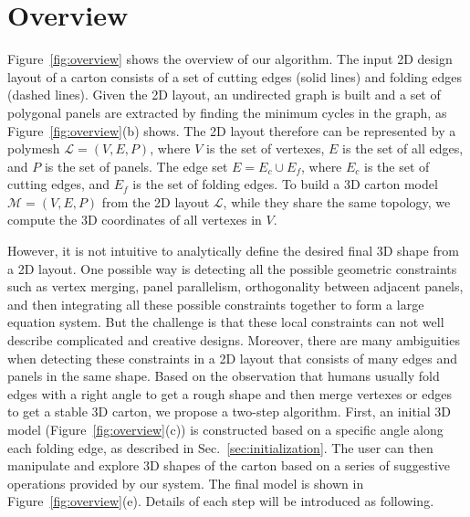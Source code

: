 \section{Overview}\label{sec:overview}


Figure~\ref{fig:overview} shows the overview of our algorithm. 
The input 2D design layout of a carton consists of a set of cutting edges (solid lines) and folding edges (dashed lines).
%
Given the 2D layout, an undirected graph is built and a set of polygonal panels are extracted by finding the minimum cycles in the graph, as Figure~\ref{fig:overview}(b) shows. 
The 2D layout therefore can be represented by a polymesh $\mathcal{L}=(V,E,P)$, where $V$ is the set of vertexes, $E$ is the set of all edges, and $P$ is the set of panels. 
The edge set $E=E_c\cup E_f$, where $E_c$ is the set of cutting edges, and $E_f$ is the set of folding edges.
%
To build a 3D carton model $\mathcal{M}=(V, E, P)$ from the 2D layout $\mathcal{L}$, while they share the same topology, we compute the 3D coordinates of all vertexes in $V$. 
%

However, it is not intuitive to analytically define the desired final 3D shape from a 2D layout. 
One possible way is detecting all the possible geometric constraints such as vertex merging, panel parallelism, orthogonality between adjacent panels, and then integrating all these possible constraints together to form a large equation system. 
But the challenge is that these local constraints can not well describe complicated and creative designs. 
Moreover, there are many ambiguities when detecting these constraints in a 2D layout that consists of many edges and panels in the same shape. 
%
Based on the observation that humans usually fold edges with a right angle to get a rough shape and then merge vertexes or edges to get a stable 3D carton, we propose a two-step algorithm. 
First, an initial 3D model (Figure~\ref{fig:overview}(c)) is constructed based on a specific angle along each folding edge, as described in Sec.~\ref{sec:initialization}.
The user can then manipulate and explore 3D shapes of the carton based on a series of suggestive operations provided by our system. 
%
The final model is shown in Figure~\ref{fig:overview}(e).
Details of each step will be introduced as following. 


